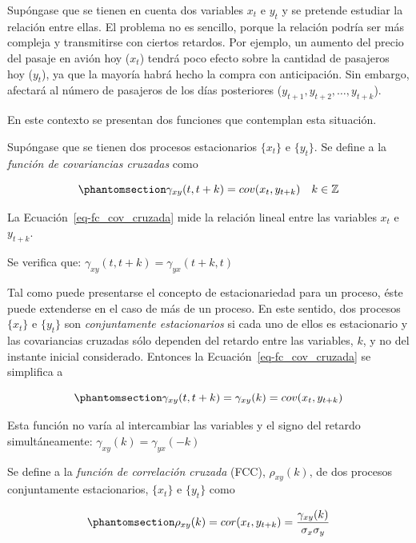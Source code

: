 \documentclass[12pt]{article}
\begin{document}
Supóngase que se tienen en cuenta dos variables \(x_t\) e \(y_t\) y se
pretende estudiar la relación entre ellas. El problema no es sencillo,
porque la relación podría ser más compleja y transmitirse con ciertos
retardos. Por ejemplo, un aumento del precio del pasaje en avión hoy
(\(x_t\)) tendrá poco efecto sobre la cantidad de pasajeros hoy
(\(y_t\)), ya que la mayoría habrá hecho la compra con anticipación. Sin
embargo, afectará al número de pasajeros de los días posteriores
(\(y_{t+1}, y_{t+2}, \dots, y_{t+k}\)).

En este contexto se presentan dos funciones que contemplan esta
situación.

Supóngase que se tienen dos procesos estacionarios \(\{x_t\}\) e
\(\{y_t\}\). Se define a la \emph{función de covariancias cruzadas} como

\begin{equation}\phantomsection\label{eq-fc_cov_cruzada}{
\gamma_{xy}(t, t+k) = cov(x_t, y_{t+k}) \quad k \in \mathbb{Z}
}\end{equation}

La Ecuación~\ref{eq-fc_cov_cruzada} mide la relación lineal entre las
variables \(x_t\) e \(y_{t+k}\).

Se verifica que: \(\gamma_{xy}(t, t+k) = \gamma_{yx}(t+k, t)\)

Tal como puede presentarse el concepto de estacionariedad para un
proceso, éste puede extenderse en el caso de más de un proceso. En este
sentido, dos procesos \(\{x_t\}\) e \(\{y_t\}\) son \emph{conjuntamente
estacionarios} si cada uno de ellos es estacionario y las covariancias
cruzadas sólo dependen del retardo entre las variables, \(k\), y no del
instante inicial considerado. Entonces la
Ecuación~\ref{eq-fc_cov_cruzada} se simplifica a

\begin{equation}\phantomsection\label{eq-fc_cov_cruz_simplificada}{
\gamma_{xy}(t, t+k) = \gamma_{xy}(k) = cov(x_t, y_{t+k})
}\end{equation}

Esta función no varía al intercambiar las variables y el signo del
retardo simultáneamente: \(\gamma_{xy}(k) = \gamma_{yx}(-k)\)

Se define a la \emph{función de correlación cruzada} (FCC),
\(\rho_{xy}(k)\), de dos procesos conjuntamente estacionarios,
\(\{x_t\}\) e \(\{y_t\}\) como

\begin{equation}\phantomsection\label{eq-ccf}{
\rho_{xy}(k) = cor(x_t, y_{t+k}) = \dfrac{\gamma_{xy}(k)}{\sigma_x \sigma_y}
}\end{equation}
\end{document}
